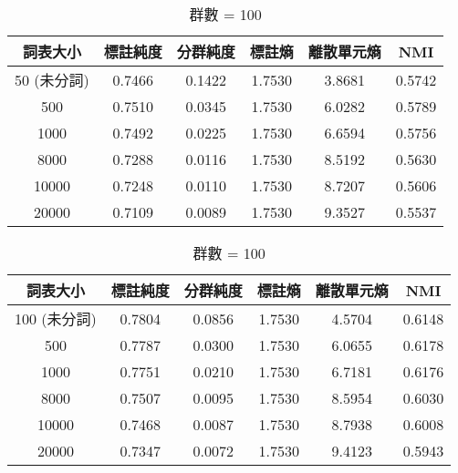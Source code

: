 
\begin{table}[!htbp]
    \centering
    \begin{subtable}[t]{\textwidth}
        \centering
        \begin{tabular}{|c|c|c|c|c|c|} \hline 
                詞表大小  & 標註純度 & 分群純度 & 標註熵 & 離散單元熵 &     NMI   \\ \hline 
               50 (未分詞)&   0.7466  &  0.1422 & 1.7530 &   3.8681 &  0.5742 \\ \hline 
                   500    &  0.7510  &  0.0345  & 1.7530 &  6.0282  &     0.5789  \\ \hline 
                  1000    &  0.7492  &  0.0225  & 1.7530 &  6.6594  &     0.5756  \\ \hline 
                  8000    &  0.7288  &  0.0116  & 1.7530 &  8.5192  &     0.5630  \\ \hline 
                 10000    &  0.7248  &  0.0110  & 1.7530 &  8.7207  &     0.5606  \\ \hline 
                 20000    &  0.7109  &  0.0089  & 1.7530 &  9.3527  &     0.5537  \\ \hline 
        \end{tabular}
\caption{群數 = 50}
        \label{tab:ch4-hubert-pcls-clu050}
    \end{subtable}        

    \jefftablesep        

    \begin{subtable}[t]{\textwidth}
        \centering
        \begin{tabular}{|c|c|c|c|c|c|} \hline 
                詞表大小  & 標註純度 & 分群純度 & 標註熵 & 離散單元熵 &     NMI   \\ \hline 
100 (未分詞)&              0.7804 &   0.0856 &         1.7530 &     4.5704 &  0.6148\\ \hline 
                   500    &  0.7787  &  0.0300  & 1.7530 &  6.0655  &     0.6178  \\ \hline 
                  1000    &  0.7751  &  0.0210  & 1.7530 &  6.7181  &     0.6176  \\ \hline 
                  8000    &  0.7507  &  0.0095  & 1.7530 &  8.5954  &     0.6030  \\ \hline 
                 10000    &  0.7468  &  0.0087  & 1.7530 &  8.7938  &     0.6008  \\ \hline 
                 20000    &  0.7347  &  0.0072  & 1.7530 &  9.4123  &     0.5943  \\ \hline 
        \end{tabular}
\caption{群數 = 100}
        \label{tab:ch4-hubert-pcls-clu100}
    \end{subtable}        


\end{table}
